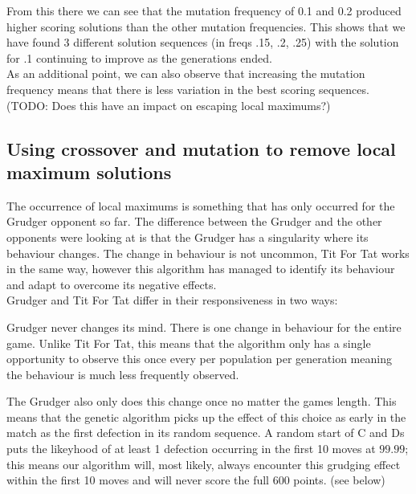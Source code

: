 
From this there we can see that the mutation frequency of 0.1 and 0.2 produced higher scoring solutions than the other mutation frequencies. This shows that we have found 3 different solution sequences (in freqs .15, .2, .25) with the solution for .1 continuing to improve as the generations ended.\\
            
As an additional point, we can also observe that increasing the mutation frequency means that there is less variation in the best scoring sequences. (TODO: Does this have an impact on escaping local maximums?)

\subsection{Using crossover and mutation to remove local maximum solutions}\label{sec:mitigating local maximums}
The occurrence of local maximums is something that has only occurred for the Grudger opponent so far. The difference between the Grudger and the other opponents were looking at is that the Grudger has a singularity where its behaviour changes. The change in behaviour is not uncommon, Tit For Tat works in the same way, however this algorithm has managed to identify its behaviour and adapt to overcome its negative effects.\\
            
Grudger and Tit For Tat differ in their responsiveness in two ways: 
            
\begin{itemize}
    \begin{item}
        Grudger never changes its mind. There is one change in behaviour for the entire game. Unlike Tit For Tat, this means that the algorithm only has a single opportunity to observe this once every per population per generation meaning the behaviour is much less frequently observed.
    \end{item}
    \begin{item}
        The Grudger also only does this change once no matter the games length. This means that the genetic algorithm picks up the effect of this choice as early in the match as the first defection in its random sequence. A random start of C and Ds puts the likeyhood of at least 1 defection occurring in the first 10 moves at \(99.99\); this means our algorithm will, most likely, always encounter this grudging effect within the first 10 moves and will never score the full 600 points. (see below)
    \end{item}
\end{itemize}
            
